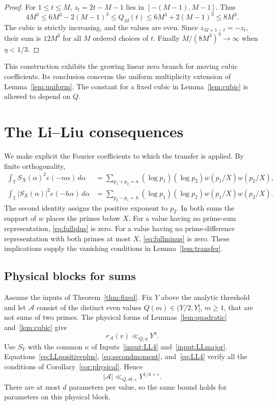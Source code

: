 \documentclass[11pt]{article}
\theoremstyle{definition}
\theoremstyle{remark}
\numberwithin{equation}{section}
\newcommand{\eps}{\varepsilon}
\newcommand{\T}{\mathbb T}
\newcommand{\A}{\mathcal A}
\begin{document}
\begin{proof}
For $1\le t\le M$, $z_t=2t-M-1$ lies in $[-(M-1),M-1]$. Thus
\[
 4M^3\le6M^3-2(M-1)^3\le Q_M(t)
     \le6M^3+2(M-1)^3\le8M^3.
\]
The cubic is strictly increasing, and the values are even.
Since $z_{M+1-t}=-z_t$, their sum is $12M^3$ for all $M$ ordered
choices of $t$. Finally $M/(8M^3)^\eta\to\infty$ when $\eta<1/3$.
\end{proof}

This construction exhibits the growing linear zero branch for moving
cubic coefficients. Its conclusion concerns the uniform multiplicity
extension of Lemma~\ref{lem:uniform}. The constant for a fixed cubic
in Lemma~\ref{lem:cubic} is allowed to depend on $Q$.

\section{The Li--Liu consequences}\label{sec:LLproof}

We make explicit the Fourier coefficients to which the transfer is
applied. By finite orthogonality,
\begin{align}
 \int_\T S_X(\alpha)^2e(-n\alpha)\,d\alpha
 &=\sum_{p_1+p_2=n}(\log p_1)(\log p_2)
                    w(p_1/X)w(p_2/X),\label{eq:fullplus}\\
 \int_\T|S_X(\alpha)|^2e(-h\alpha)\,d\alpha
 &=\sum_{p_2-p_1=h}(\log p_1)(\log p_2)
                    w(p_1/X)w(p_2/X).\label{eq:fullminus}
\end{align}
The second identity assigns the positive exponent to $p_2$.
In both sums the support of $w$ places the primes below $X$.
For a value having no prime-sum representation,
\eqref{eq:fullplus} is zero. For a value having no prime-difference
representation with both primes at most $X$, \eqref{eq:fullminus}
is zero. These implications supply the vanishing conditions in
Lemma~\ref{lem:transfer}.

\subsection{Physical blocks for sums}

Assume the inputs of Theorem~\ref{thm:fixed}. Fix $Y$ above the
analytic threshold and let $\A$ consist of the distinct even values
$Q(m)\in(Y/2,Y]$, $m\ge1$, that are not sums of two primes.
The physical forms of Lemmas~\ref{lem:quadratic} and~\ref{lem:cubic}
give
\begin{equation}\label{eq:Dfixed}
                           r_\A(v)\ll_{Q,\eta}Y^\eta.
\end{equation}
Use $S_Y$ with the common $\kappa$ of Inputs~\ref{input:LL4}
and~\ref{input:LLmajor}. Equations~\eqref{eq:LLpositiveplus},
\eqref{eq:secondmoment}, and~\eqref{eq:LL4} verify all the
conditions of Corollary~\ref{cor:physical}. Hence
\begin{equation}\label{eq:LLphysical}
                         |\A|\ll_{Q,\Theta,\eps}Y^{1/4+\eps}.
\end{equation}
There are at most $d$ parameters per value, so the same
bound holds for parameters on this physical block.
\end{document}
